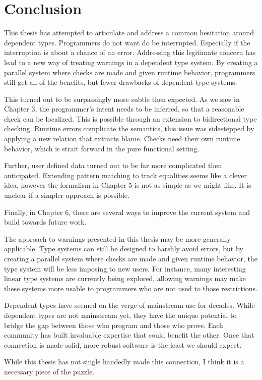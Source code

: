 \chapter{Conclusion}
\label{chapter:Conclusion}
\thispagestyle{myheadings}

This thesis has attempted to articulate and address a common hesitation around dependent types.
Programmers do not want do be interrupted.
Especially if the interruption is about a chance of an error.
Addressing this legitimate concern has lead to a new way of treating warnings in a dependent type system.
By creating a parallel system where checks are made and given runtime behavior, programmers still get all of the benefits, but fewer drawbacks of dependent type systems.

This turned out to be surpassingly more subtle then expected.
As we saw in Chapter 3, the programmer's intent needs to be inferred, so that a reasonable check can be localized.
This is possible through an extension to bidirectional type checking.
Runtime errors complicate the semantics, this issue was sidestepped by applying a new relation that extracts blame.
Checks need their own runtime behavior, which is strait forward in the pure functional setting.

Further, user defined data turned out to be far more complicated then anticipated.
Extending pattern matching to track equalities seems like a clever idea, however the formalism in Chapter 5 is not as simple as we might like.
It is unclear if a simpler approach is possible.

Finally, in Chapter 6, there are several ways to improve the current system and build towards future work.

The approach to warnings presented in this thesis may be more generally applicable.
Type systems can still be designed to harshly avoid errors, but by creating a parallel system where checks are made and given runtime behavior, the type system will be less imposing to new users.
For instance, many interesting linear type systems are currently being explored, allowing warnings may make these systems more usable to programmers who are not used to those restrictions.

Dependent types have seemed on the verge of mainstream use for decades.
While dependent types are not mainstream yet, they have the unique potential to bridge the gap between those who program and those who prove.
Each community has built invaluable expertise that could benefit the other.
Once that connection is made solid, more robust software is the least we should expect.

While this thesis has not single handedly made this connection, I think it is a necessary piece of the puzzle.
